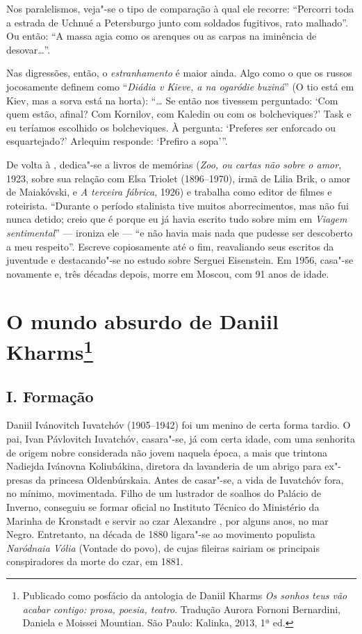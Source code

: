 Nos paralelismos, veja"-se o tipo de comparação à qual ele
recorre: ``Percorri toda a estrada de Uchnué a Petersburgo
junto com soldados fugitivos, rato malhado''. Ou então: ``A
massa agia como os arenques ou as carpas na iminência de
desovar\ldots{}''.

Nas digressões, então, o \emph{estranhamento} é maior ainda. Algo
como o que os russos jocosamente definem como ``\emph{Diádia v
Kieve, a na ogaródie buziná}'' (O tio está em Kiev, mas a sorva
está na horta): ``\ldots{} Se então nos tivessem perguntado: `Com
quem estão, afinal? Com Kornilov, com Kaledin ou com os bolcheviques?'
Task e eu teríamos escolhido os bolcheviques. À pergunta: ‘Preferes
ser enforcado ou esquartejado?’ Arlequim responde: ‘Prefiro a
sopa’''.

De volta à , dedica"-se a livros de memórias
(\emph{Zoo, ou cartas não sobre o amor}, 1923, sobre sua relação
com Elsa Triolet (1896--1970), irmã de Lilia Brik, o amor de
Maiakóvski, e \emph{A terceira fábrica}, 1926) e trabalha como
editor de filmes e roteirista. ``Durante o período stalinista
tive muitos aborrecimentos, mas não fui nunca detido; creio
que é porque eu já havia escrito tudo sobre mim em \emph{Viagem
sentimental}'' --- ironiza ele --- ``e não havia mais nada que
pudesse ser descoberto a meu respeito''. Escreve copiosamente
até o fim, reavaliando seus escritos da juventude e destacando"-se
no estudo sobre Serguei Eisenstein. Em 1956, casa"-se novamente e,
três décadas depois, morre em Moscou, com 91 anos de idade.

\chapter{O mundo absurdo de Daniil Kharms\footnote{Publicado
como posfácio da antologia de Daniil Kharms \emph{Os sonhos teus
vão acabar contigo: prosa, poesia, teatro}. Tradução Aurora
Fornoni Bernardini, Daniela e Moissei Mountian. São Paulo:
Kalinka, 2013, 1ª ed.}}

\section{\uppercase{I}. \uppercase{F}ormação}

Daniil Ivánovitch Iuvatchóv (1905--1942) foi um menino de certa
forma tardio. O pai, Ivan Pávlovitch Iuvatchóv, casara"-se, já
com certa idade, com uma senhorita de origem nobre considerada
não jovem naquela época, a mais que trintona Nadiejda Ivánovna
Koliubákina, diretora da lavanderia de um abrigo para ex"-presas
da princesa Oldenbúrskaia. Antes de casar"-se, a vida de Iuvatchóv
fora, no mínimo, movimentada. Filho de um lustrador de soalhos
do Palácio de Inverno, conseguiu se formar oficial no Instituto
Técnico do Ministério da Marinha de Kronstadt e servir ao czar
Alexandre , por alguns anos, no mar Negro. Entretanto,
na década de 1880 ligara"-se ao movimento populista \emph{Naródnaia
Vólia} (Vontade do povo), de cujas fileiras sairiam os principais
conspiradores da morte do czar, em 1881.

